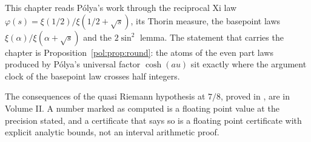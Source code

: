 \label{chap:polyazeros}

This chapter reads P\'olya's work through the reciprocal Xi law $\varphi(s)=\xi(1/2)/\xi(1/2+\sqrt s)$, its Thorin measure, the basepoint laws $\xi(\alpha)/\xi(\alpha+\sqrt s)$ and the $2\sin^2$ lemma. The statement that carries the chapter is Proposition~\ref{pol:prop:round}: the atoms of the even part laws produced by P\'olya's universal factor $\cosh(au)$ sit exactly where the argument clock of the basepoint law crosses half integers.

The consequences of the quasi Riemann hypothesis at $7/8$, proved in \cite{OAI26a}, are in Volume II. A number marked as computed is a floating point value at the precision stated, and a certificate that says so is a floating point certificate with explicit analytic bounds, not an interval arithmetic proof.
